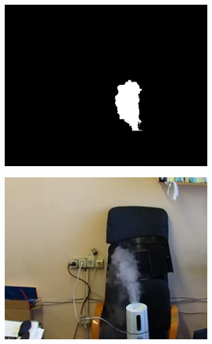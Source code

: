\documentclass[14pt, a4paper]{extreport}
\begin{document}
\begin{figure}[h!]
\begin{subfigure}{.32\textwidth}
			\includegraphics[width = \textwidth]{image/chapter_3/examples/mask/214}
		\end{subfigure}
		\begin{subfigure}{.32\textwidth}
			\centering
			\includegraphics[width = \textwidth]{image/chapter_3/examples/img/240}
			\caption{}
		\end{subfigure}
		\hspace{0.1cm}
		\begin{subfigure}{.32\textwidth}
			\centering

\end{subfigure}
\end{figure}
\end{document}
